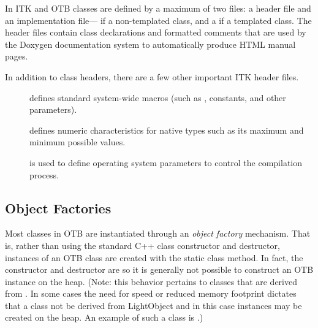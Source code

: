 In ITK and OTB classes are defined by a maximum of two files: a header  file
and an implementation file--- if a non-templated class, and a
 if a templated class.
The header files contain class declarations
and formatted comments that are used by the Doxygen documentation
system to automatically produce HTML manual pages.

In addition to class headers, there are a few other important ITK header files.
\begin{description}
        \item[] defines standard system-wide macros (such as ,
        constants, and other parameters).

        \item[] defines numeric characteristics for native types such
        as its maximum and minimum possible values.

        \item[] is used to define operating system parameters to control
        the compilation process.
\end{description}

\subsection{Object Factories}
\label{sec:ObjectFactories}


Most classes in OTB are instantiated through an \emph{object factory}
mechanism. That is, rather than using the standard C++ class constructor and
destructor, instances of an OTB class are created with the static class
 method. In fact, the constructor and destructor are
 so it is generally not possible to construct an OTB
instance on the heap. (Note: this behavior pertains to classes that are
derived from . In some cases the need for speed or
reduced memory footprint dictates that a class not be derived from
LightObject and in this case instances may be created on the heap. An
example of such a class is .)

